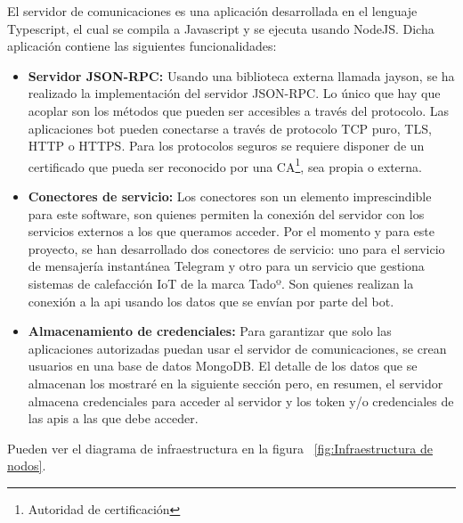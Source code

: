 \documentclass[spanish,12pt, a4paper, twoside]{paper}
\begin{document}
El servidor de comunicaciones es una aplicación desarrollada en el lenguaje Typescript, el cual se compila a Javascript y se ejecuta usando NodeJS. Dicha aplicación contiene las siguientes funcionalidades:

\begin{itemize}
\item \textbf{Servidor JSON-RPC:} Usando una biblioteca externa llamada jayson, se ha realizado la implementación del servidor JSON-RPC. Lo único que hay que acoplar son los métodos que pueden ser accesibles a través del protocolo. Las aplicaciones bot pueden conectarse a través de protocolo TCP puro, TLS, HTTP o HTTPS. Para los protocolos seguros se requiere disponer de un certificado que pueda ser reconocido por una CA\footnote{Autoridad de certificación}, sea propia o externa.

\item \textbf{Conectores de servicio:} Los conectores son un elemento imprescindible para este software, son quienes permiten la conexión del servidor con los servicios externos a los que queramos acceder. Por el momento y para este proyecto, se han desarrollado dos conectores de servicio: uno para el servicio de mensajería instantánea Telegram y otro para un servicio que gestiona sistemas de calefacción IoT de la marca Tadoº. Son quienes realizan la conexión a la api usando los datos que se envían por parte del bot.

\item \textbf{Almacenamiento de credenciales:} Para garantizar que solo las aplicaciones autorizadas puedan usar el servidor de comunicaciones, se crean usuarios en una base de datos MongoDB. El detalle de los datos que se almacenan los mostraré en la siguiente sección pero, en resumen, el servidor almacena credenciales para acceder al servidor y los token y/o credenciales de las apis a las que debe acceder.
\end{itemize}

Pueden ver el diagrama de infraestructura en la figura ~\ref{fig:Infraestructura de nodos}.
\end{document}
